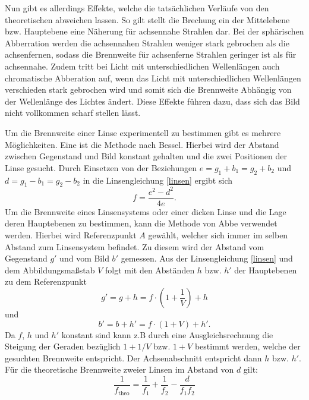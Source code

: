Nun gibt es allerdings Effekte, welche die tatsächlichen Verläufe von den theoretischen abweichen lassen. So gilt stellt die Brechung ein der Mittelebene bzw. Hauptebene eine Näherung für achsennahe Strahlen dar. Bei der sphärischen Abberration werden die achsennahen Strahlen weniger stark gebrochen als die achsenfernen, sodass die Brennweite für achsenferne Strahlen geringer ist als für achsennahe. Zudem tritt bei Licht mit unterschiedlichen Wellenlängen auch chromatische Abberation auf, wenn das Licht mit unterschiedlichen Wellenlängen verschieden stark gebrochen wird und somit sich die Brennweite Abhängig von der Wellenlänge des Lichtes ändert. Diese Effekte führen dazu, dass sich das Bild nicht vollkommen scharf stellen lässt.

Um die Brennweite einer Linse experimentell zu bestimmen gibt es mehrere Möglichkeiten. Eine ist die Methode nach Bessel. Hierbei wird der Abstand zwischen Gegenstand und Bild konstant gehalten und die zwei Positionen der Linse gesucht. Durch Einsetzen von der Beziehungen $e=g_1+b_1=g_2+b_2$ und $d=g_1−b_1=g_2−b_2$ in die Linsengleichung \eqref{linsen} ergibt sich
\begin{equation}
	f=\frac{e^2-d^2}{4 e}. \label{unnoetig1}
\end{equation}
Um die Brennweite eines Linsensystems oder einer dicken Linse und die Lage deren Hauptebenen zu bestimmen, kann die Methode von Abbe verwendet werden. Hierbei wird Referenzpunkt $A$ gewählt, welcher sich immer im selben Abstand zum Linsensystem befindet. Zu diesem wird der Abstand vom Gegenstand $g'$ und vom Bild $b'$ gemessen. Aus der Linsengleichung \eqref{linsen} und dem Abbildungsmaßstab $V$ folgt mit den Abständen $h$ bzw. $h'$ der Hauptebenen zu dem Referenzpunkt
\begin{equation}
	g'=g+h=f \cdot \left(1+\frac{1}{V}\right)+h\label{unnoetig2}
\end{equation}
und
\begin{equation}
b'=b+h'=f \cdot \left(1+V\right)+h' .\label{unnoetig3}
\end{equation}
Da $f$, $h$ und $h'$ konstant sind kann z.B durch eine Ausgleichsrechnung die Steigung der Geraden bezüglich $1+1/V$ bzw. $1+V$ bestimmt werden, welche der gesuchten Brennweite entspricht. Der Achsenabschnitt entspricht dann $h$ bzw. $h'$.
Für die theoretische Brennweite zweier Linsen im Abstand von $d$ gilt:
\begin{equation}
  \frac{1}{f_\text{theo}} = \frac{1}{f_1} + \frac{1}{f_2} - \frac{d}{f_1 f_2}\label{theo}
\end{equation}

